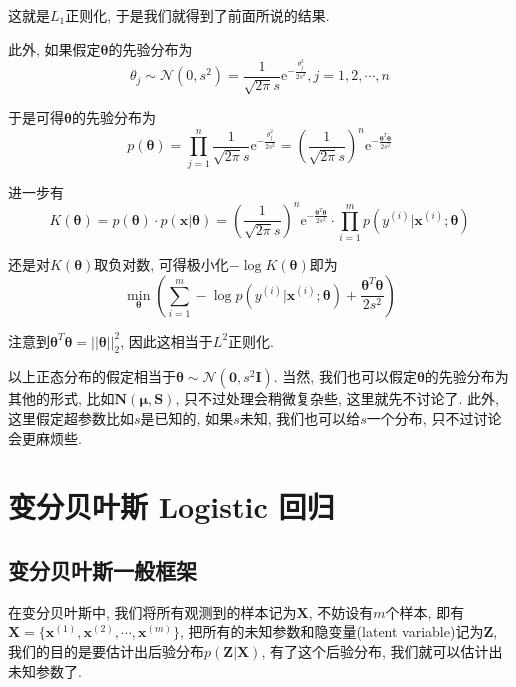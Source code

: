 \documentclass[a4paper,UTF8]{ctexart}
\theoremstyle{plain} \newtheorem{theorem}{定理}[section]
\theoremstyle{plain} \newtheorem{definition}{定义}[section]
\theoremstyle{plain} \newtheorem{lemma}{引理}[section]
\theoremstyle{plain} \newtheorem{proposition}{命题}[section]
\theoremstyle{plain} \newtheorem{example}{例}[section]
\theoremstyle{plain} \newtheorem{remark}{注}[section]
\theoremstyle{plain} \newtheorem{corollary}{推论}[section]
\begin{document}
这就是$L_{1}$正则化, 于是我们就得到了前面所说的结果.

此外, 如果假定$\bm{\theta}$的先验分布为
\begin{equation*}
\theta_{j} \sim \mathcal{N} (0, s^{2}) = \frac{1}{\sqrt{2 \pi} s} \mathrm{e}^{-\frac{\theta_{j}^{2}}{2s^2}} , j = 1, 2, \cdots, n
\end{equation*}

于是可得$\bm{\theta}$的先验分布为
\begin{equation*}
p(\bm{\theta}) = \prod_{j=1}^{n} \frac{1}{\sqrt{2 \pi} s} \mathrm{e}^{-\frac{\theta_{j}^{2}}{2s^2}} = \left( \frac{1}{\sqrt{2 \pi} s} \right)^{n} \mathrm{e}^{-\frac{\bm{\theta}^{T} \bm{\theta}}{2s^2}}
\end{equation*}

进一步有
\begin{equation*}
K(\bm{\theta}) = p(\bm{\theta}) \cdot p(\bm{x | \theta}) = \left( \frac{1}{\sqrt{2 \pi} s} \right)^{n} \mathrm{e}^{-\frac{\bm{\theta}^{T} \bm{\theta}}{2s^2}} \cdot \prod_{i=1}^{m} p(y^{(i)}|\bm{x}^{(i)};\bm{\theta})
\end{equation*}

还是对$K(\bm{\theta})$取负对数, 可得极小化$-\log K(\bm{\theta})$即为
\begin{equation*}
\min_{\bm{\theta}} \left( \sum_{i=1}^{m} - \log p(y^{(i)} | \bm{x}^{(i)}; \bm{\theta}) + \frac{\bm{\theta}^{T} \bm{\theta}}{2s^2} \right)
\end{equation*}

注意到$\bm{\theta}^{T} \bm{\theta} = ||\bm{\theta}||_{2}^{2}$, 因此这相当于$L^{2}$正则化.

以上正态分布的假定相当于$\bm{\theta} \sim \mathcal{N}(\bm{0}, s^{2}\bm{I})$. 当然, 我们也可以假定$\bm{\theta}$的先验分布为其他的形式, 比如$\bm{N(\mu, S)}$, 只不过处理会稍微复杂些, 这里就先不讨论了. 此外, 这里假定超参数比如$s$是已知的, 如果$s$未知, 我们也可以给$s$一个分布, 只不过讨论会更麻烦些.



\section{变分贝叶斯 Logistic 回归}

\subsection{变分贝叶斯一般框架}
在变分贝叶斯中, 我们将所有观测到的样本记为$\bm{X}$, 不妨设有$m$个样本, 即有$\bm{X} = \{ \bm{x}^{(1)}, \bm{x}^{(2)}, \cdots, \bm{x}^{(m)} \}$, 把所有的未知参数和隐变量(latent variable)记为$\bm{Z}$, 我们的目的是要估计出后验分布$p(\bm{Z} | \bm{X})$, 有了这个后验分布, 我们就可以估计出未知参数了.
\end{document}
